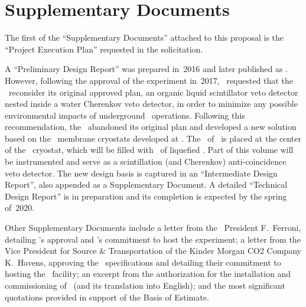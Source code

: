 \section{Supplementary Documents}
The first of the ``Supplementary Documents'' attached to this proposal is the ``Project Execution Plan'' requested in the solicitation.

A ``Preliminary Design Report'' was prepared in~2016 and later published as .  However, following the approval of the experiment in~2017, \LNGS\ requested that the \GADMC\ reconsider its original approved plan, an organic liquid scintillator veto detector nested inside a water Cherenkov veto detector, in order to minimize any possible environmental impacts of underground \LNGS\ operations.  Following this recommendation, the \GADMC\ abandoned its original plan and developed a new solution based on the \pDUNE\ membrane cryostats developed at \CERN.  The \LArTPC\ of \DSks\ is placed at the center of the \pDUNE\ cryostat, which will be filled with \pDUNELArMass\ of liquefied \AAr. Part of this volume will be instrumented and serve as a scintillation (and Cherenkov) anti-coincidence veto detector.  The new design basis is captured in an ``Intermediate Design Report'', also appended as a Supplementary Document.  A detailed ``Technical Design Report'' is in preparation and its completion is expected by the spring of~2020.

Other Supplementary Documents include a letter from the \INFN\ President F.~Ferroni, detailing \INFN's approval and \LNGS's commitment to host the experiment; a letter from the Vice President for Source \& Transportation of the Kinder Morgan CO2 Company K.~Havens, approving the \Urania\ specifications and detailing their commitment to hosting the \Urania\ facility; an excerpt from the authorization for the installation and commissioning of \SeruciOne\ (and its translation into English); and the most significant quotations provided in support of the Basis of Estimate.